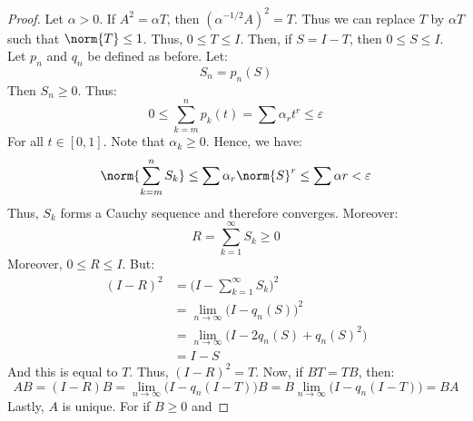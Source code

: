         \begin{proof}
            Let $\alpha>0$. If $A^{2}=\alpha{T}$, then
            $(\alpha^{\minus{1}/2}A)^{2}=T$. Thus we can replace
            $T$ by $\alpha{T}$ such that $\norm{T}\leq{1}$.
            Thus, $0\leq{T}\leq{I}$. Then, if $S=I-T$, then
            $0\leq{S}\leq{I}$. Let $p_{n}$ and $q_{n}$ be
            defined as before. Let:
            \begin{equation}
                S_{n}=p_{n}(S)
            \end{equation}
            Then $S_{n}\geq{0}$. Thus:
            \begin{equation}
                0\leq\sum_{k=m}^{n}p_{k}(t)=
                \sum\alpha_{r}t^{r}\leq\varepsilon
            \end{equation}
            For all $t\in[0,1]$. Note that $\alpha_{k}\geq{0}$.
            Hence, we have:
            \begin{equation}
                \norm{\sum_{k=m}^{n}S_{k}}
                \leq\sum\alpha_{r}\norm{S}^{r}\leq
                \sum\alpha{r}<\varepsilon
            \end{equation}
            Thus, $S_{k}$ forms a Cauchy sequence and therefore
            converges. Moreover:
            \begin{equation}
                R=\sum_{k=1}^{\infty}S_{k}\geq{0}
            \end{equation}
            Moreover, $0\leq{R}\leq{I}$. But:
            \begin{align}
                (I-R)^{2}
                &=\Big(I-\sum_{k=1}^{\infty}S_{k}\Big)^{2}\\
                &=\underset{n\rightarrow\infty}{\lim}
                    \big(I-q_{n}(S)\big)^{2}\\
                &=\underset{n\rightarrow\infty}{\lim}
                    \big(I-2q_{n}(S)+q_{n}(S)^{2}\big)\\
                &=I-S
            \end{align}
            And this is equal to $T$. Thus, $(I-R)^{2}=T$.
            Now, if $BT=TB$, then:
            \begin{equation}
                AB=(I-R)B
                =\underset{n\rightarrow\infty}{\lim}
                    \big(I-q_{n}(I-T)\big)B
                =B\underset{n\rightarrow\infty}{\lim}
                    \big(I-q_{n}(I-T)\big)
                =BA
            \end{equation}
            Lastly, $A$ is unique. For if $B\geq{0}$ and

\end{proof}
